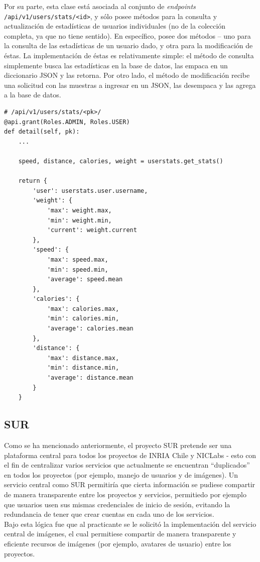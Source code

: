 \documentclass[11pt,letterpaper]{article}
\begin{document}
Por su parte, esta clase está asociada al conjunto de \emph{endpoints} \texttt{/api/v1/users/stats/\textless id\textgreater}, y sólo posee métodos para la consulta y actualización de estadísticas de usuarios individuales (no de la colección completa, ya que no tiene sentido). En específico, posee dos métodos -- uno para la consulta de las estadísticas de un usuario dado, y otra para la modificación de éstas. La implementación de éstas es relativamente simple: el método de consulta simplemente busca las estadísticas en la base de datos, las empaca en un diccionario JSON y las retorna. Por otro lado, el método de modificación recibe una solicitud con las muestras a ingresar en un JSON, las desempaca y las agrega a la base de datos.\\

\begin{lstlisting}[title=Extracto del método de consulta de estadísticas de usuario.]
# /api/v1/users/stats/<pk>/
@api.grant(Roles.ADMIN, Roles.USER)
def detail(self, pk):
    ...

    speed, distance, calories, weight = userstats.get_stats()

    return {
        'user': userstats.user.username,
        'weight': {
            'max': weight.max,
            'min': weight.min,
            'current': weight.current
        },
        'speed': {
            'max': speed.max,
            'min': speed.min,
            'average': speed.mean
        },
        'calories': {
            'max': calories.max,
            'min': calories.min,
            'average': calories.mean
        },
        'distance': {
            'max': distance.max,
            'min': distance.min,
            'average': distance.mean
        }
    }
\end{lstlisting}

\newpage
\subsection{SUR}

Como se ha mencionado anteriormente, el proyecto SUR pretende ser una plataforma central para todos los proyectos de INRIA Chile y NICLabs - esto con el fin de centralizar varios servicios que actualmente se encuentran ``duplicados'' en todos los proyectos (por ejemplo, manejo de usuarios y de imágenes). Un servicio central como SUR permitiría que cierta información se pudiese compartir de manera transparente entre los proyectos y servicios, permitiedo por ejemplo que usuarios usen sus mismas credenciales de inicio de sesión, evitando la redundancia de tener que crear cuentas en cada uno de los servicios.
\\
Bajo esta lógica fue que al practicante se le solicitó la implementación del servicio central de imágenes, el cual permitiese compartir de manera transparente y eficiente recursos de imágenes (por ejemplo, avatares de usuario) entre los proyectos.
\end{document}
